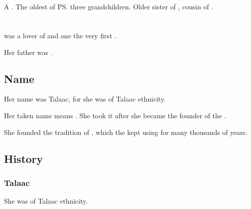 \section{\Thiencaste}
\index{\Thiencaste}
A \dragon. 
The oldest of \ps{\QuessanthIshnaruchaefir} three grandchildren. 
Older sister of \Tentocoth, cousin of \Rathyon. 















\section[Tyrasshana]{\TyarithXserasshana}
\index{\TyarithXserasshana}
\TyarithXserasshana{} was a lover of \Sethicus and one the very first \dragons. 

Her father was . 







\subsection{Name}
Her name was Talaac, for she was of Talaac ethnicity.

Her taken name \quo{\Kserasshana} means . 
She took it after she became the founder of the \dzraicchenosses. 

She founded the tradition of , which the \dragons{} kept using for many thousands of years. 






\subsection{History}





\subsubsection{Talaac}
She was of Talaac ethnicity.





